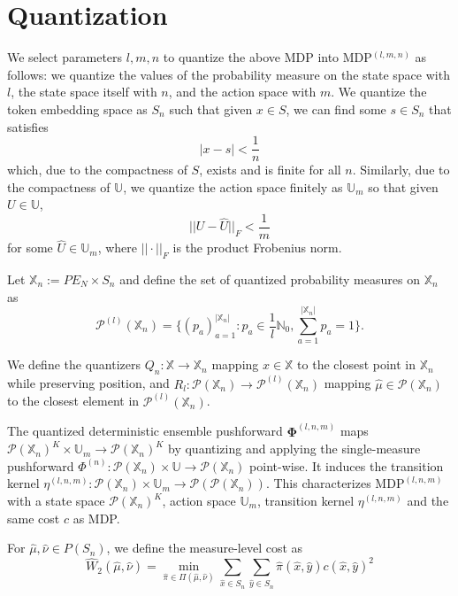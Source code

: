 \documentclass{article}
\begin{document}
\section{Quantization}

We select parameters $l, m, n$ to quantize the above MDP into MDP$^{(l, m, n)}$ as follows: we quantize the values of the probability measure on the state space with $l$, the state space itself with $n$, and the action space with $m$. 
We quantize the token embedding space as $S_n$ such that given $x \in S$, we can find some $s \in S_n$ that satisfies
$$|x - s| < \frac{1}{n}$$
which, due to the compactness of $S$, exists and is finite for all $n$. Similarly, due to the compactness of $\mathbb{U}$, we quantize the action space finitely as $\mathbb{U}_m$ so that given $U \in \mathbb{U}$,
$$||U - \hat U||_F < \frac{1}{m}$$
for some $\hat U \in \mathbb{U}_m$, where $||\cdot ||_F$ is the product Frobenius norm. 

Let $\mathbb{X}_n := PE_N \times S_n$ and define the set of quantized probability measures on $\mathbb{X}_n$ as 
$$\mathcal{P} ^{(l)}(\mathbb X_n) = \{(p_a)_{a = 1}^{|\mathbb X_n|}: p_a \in \frac{1}{l} \mathbb{N}_0, \sum_{a = 1}^{|\mathbb X_n|} p_a = 1\}.$$

We define the quantizers $Q_n : \mathbb{X} \to \mathbb{X}_n$ mapping $x \in \mathbb{X}$ to the closest point in $\mathbb{X}_n$ while preserving position, and $R_l : \mathcal P(\mathbb X _n) \to \mathcal P^{(l)}(\mathbb X _n)$ mapping $\hat \mu \in \mathcal P(\mathbb X _n)$ to the closest element in $\mathcal P^{(l)}(\mathbb X _n)$. 

The quantized deterministic ensemble pushforward $\bm \Phi^{(l, n, m)}$ maps $\mathcal P(\mathbb{X}_n)^K\times \mathbb U_m \to \mathcal P(\mathbb X_n)^K$ by quantizing and applying the single-measure pushforward $\Phi ^{(n)}: \mathcal P(\mathbb X_n) \times \mathbb U\to \mathcal P (\mathbb X_n)$ point-wise. It induces the transition kernel $\eta ^{(l, n, m)} : \mathcal P(\mathbb{X}_n)\times \mathbb U_m \to \mathcal P(\mathcal P(\mathbb X_n))$. This characterizes $\text{MDP}^{(l, n, m)}$ with a state space $\mathcal P(\mathbb{X}_n)^K$, action space $\mathbb U_m$, transition kernel $\eta^{(l, n, m)}$ and the same cost $c$ as MDP.

For $\hat \mu, \hat \nu \in P(S_n)$, we define the measure-level cost as 
$$\hat W_2 (\hat \mu, \hat \nu) = \min _{\hat \pi \in \Pi (\hat \mu, \hat \nu)} \sum _ {\hat x \in S_n}  \sum _ {\hat y \in S_n} \hat \pi (\hat x, \hat y)c(\hat x, \hat y)^2$$
\end{document}
